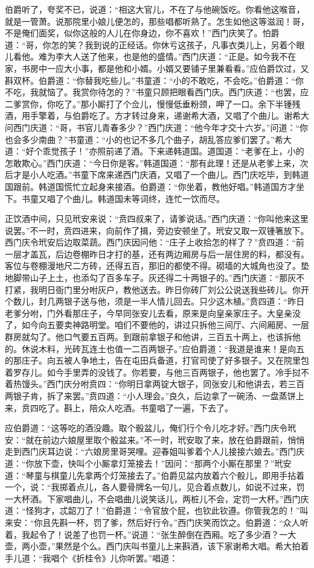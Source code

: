 伯爵听了，夸奖不已，说道：“相这大官儿，不在了与他碗饭吃。你看他这喉音，就是一管萧。说那院里小娘儿便怎的，那些唱都听熟了。怎生如他这等滋润！哥，不是俺们面奖，似你这般的人儿在你身边，你不喜欢！”西门庆笑了。怕爵道：“哥，你怎的笑？我到说的正经话。你休亏这孩子，凡事衣类儿上，另着个眼儿看他。难为李大人送了他来，也是他的盛情。”西门庆道：“正是。如今我不在家，书房中一应大小事，都是他和小婿。小婿又要铺子里兼看看。”应伯爵饮过，又斟双杯。伯爵道：“你替我吃些儿。”书童道：“小的不敢吃，不会吃。”伯爵道：“你不吃，我就恼了。我赏你待怎的？”书童只顾把眼看西门庆。西门庆道：“也罢，应二爹赏你，你吃了。”那小厮打了个佥儿，慢慢低垂粉颈，呷了一口。余下半锺残酒，用手擎着，与伯爵吃了。方才转过身来，递谢希大酒，又唱了个曲儿。谢希大问西门庆道：“哥，书官儿青春多少？”西门庆道：“他今年才交十六岁。”问道：“你也会多少南曲？”书童道：“小的也记不多几个曲子，胡乱答应爹们罢了。”希大道：“好个乖觉孩子！”亦照前递了酒。下来递韩道国。道国道：“老爹在上，小的怎敢欺心。”西门庆道：“今日你是客。”韩道国道：“那有此理！还是从老爹上来，次后才是小人吃酒。”书童下席来递西门庆酒，又唱了一个曲儿。西门庆吃毕，到韩道国跟前。韩道国慌忙立起身来接酒。伯爵道：“你坐着，教他好唱。”韩道国方才坐下。书童又唱了个曲儿。韩道国未等词终，连忙一饮而尽。

正饮酒中间，只见玳安来说：“贲四叔来了，请爹说话。”西门庆道：“你叫他来这里说罢。”不一时，贲四进来，向前作了揖，旁边安顿坐了。玳安又取一双锺箸放下。西门庆令玳安后边取菜蔬。西门庆因问他：“庄子上收拾怎的样了？”贲四道：“前一层才盖瓦，后边卷棚昨日才打的基，还有两边厢房与后一层住房的料，都没有。客位与卷棚漫地尺二方砖，还得五百，那旧的都使不得。砌墙的大城角也没了。垫地脚带山子上土，也添勾了百多车子。灰还得二十两银子的。”西门庆道：“那灰不打紧，我明日衙门里分咐灰户，教他送去。昨日你砖厂刘公公说送我些砖儿。你开个数儿，封几两银子送与他，须是一半人情儿回去。只少这木植。”贲四道：“昨日老爹分咐，门外看那庄子，今早同张安儿去看，原来是向皇亲家庄子。大皇亲没了，如今向五要卖神路明堂。咱们不要他的，讲过只拆他三间厅、六间厢房、一层群房就勾了。他口气要五百两。到跟前拿银子和他讲，三百五十两上，也该拆他的。休说木料，光砖瓦连土也值一二百两银子。”应伯爵道：“我道是谁来！是向五的那庄子。向五被人争地土，告在屯田兵备道，打官司使了好多银子。又在院里包着罗存儿。如今手里弄的没钱了。你若要，与他三百两银子，他也罢了。冷手挝不着热馒头。”西门庆分咐贲四：“你明日拿两锭大银子，同张安儿和他讲去，若三百两银子肯，拆了来罢。”贲四道：“小人理会。”良久，后边拿了一碗汤、一盘蒸饼上来，贲四吃了。斟上，陪众人吃酒。书童唱了一遍，下去了。

应伯爵道：“这等吃的酒没趣。取个骰盆儿，俺们行个令儿吃才好。”西门庆令玳安：“就在前边六娘屋里取个骰盆来。”不一时，玳安取了来，放在伯爵跟前，悄悄走到西门庆耳边说：“六娘房里哥哭哩。迎春姐叫爹着个人儿接接六娘去。”西门庆道：“你放下壶，快叫个小厮拿灯笼接去！”因问：“那两个小厮在那里？”玳安道：“琴童与棋童儿先拿两个灯笼接去了。”伯爵见盆内放着六个骰儿，即用手拈着一个，说：“我掷着点儿，各人要骨牌名一句儿，见合着点数儿，如说不过来，罚一大杯酒。下家唱曲儿，不会唱曲儿说笑话儿，两桩儿不会，定罚一大杯。”西门庆道：“怪狗才，忒韶刀了！”伯爵道：“令官放个屁，也钦此钦遵。你管我怎的！”叫来安：“你且先斟一杯，罚了爹，然后好行令。”西门庆笑而饮之。伯爵道：“众人听着，我起令了！说差了也罚一杯。”说道：“张生醉倒在西厢。吃了多少酒？一大壶，两小壶，”果然是个么。西门庆叫书童儿上来斟酒，该下家谢希大唱。希大拍着手儿道：“我唱个《折桂令》儿你听罢。”唱道：

